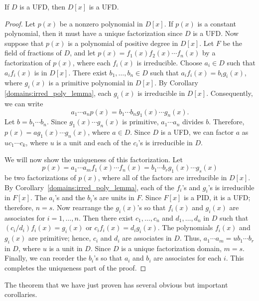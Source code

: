 \begin{theorem}
If $D$ is a UFD, then $D[x]$ is a UFD.
\end{theorem}
 
 
\begin{proof}
Let $p(x)$ be a nonzero polynomial in $D[x]$.  If $p(x)$ is a constant
polynomial, then it must have a unique factorization since $D$ is a
UFD. Now suppose that $p(x)$ is a polynomial of positive degree in
$D[x]$. Let $F$ be the field of fractions of $D$, and let $p(x) =
f_1(x) f_2(x) \cdots f_n(x)$ by a factorization of $p(x)$, where each
$f_i(x)$ is irreducible. Choose $a_i \in D$ such that $a_i f_i(x)$ is in
$D[x]$. There exist $b_1, \ldots, b_n \in D$ such that $a_i f_i(x) =
b_i g_i(x)$, where $g_i(x)$ is a primitive polynomial in $D[x]$. By 
Corollary \ref{domains:irred_poly_lemma}, each $g_i(x)$ is irreducible in $D[x]$. Consequently, 
we can write
\[
a_1 \cdots a_n p(x) = b_1 \cdots b_n g_1(x) \cdots g_n(x).
\]
Let $b = b_1 \cdots b_n$. Since $g_1(x) \cdots g_n(x)$ is primitive,
$a_1 \cdots a_n$ divides $b$. Therefore, $p(x) = a g_1(x) \cdots
g_n(x)$, where $a \in D$. Since $D$ is a UFD, we can factor $a$ as $u
c_1 \cdots c_k$, where $u$ is a unit and each of the $c_i$'s is
irreducible in $D$. 


We will now show the uniqueness of this factorization. Let
\[
p(x) = a_1 \cdots a_m f_1(x) \cdots f_n(x) = b_1 \cdots b_r g_1(x)
\cdots g_s(x)
\]
be two factorizations of $p(x)$, where all of the factors are
irreducible in $D[x]$.  By Corollary~\ref{domains:irred_poly_lemma}, each of the $f_i$'s and
$g_i$'s is irreducible in $F[x]$. The $a_i$'s and the $b_i$'s are
units in $F$. Since $F[x]$ is a PID, it is a UFD; therefore, $n=s$.
Now rearrange the $g_i(x)$'s so that $f_i(x)$ and $g_i(x)$ are
associates for $i = 1, \ldots, n$.  Then there exist $c_1, \ldots,
c_n$ and $d_1, \ldots, d_n$ in $D$ such that $(c_i / d_i) f_i(x) =
g_i(x)$ or $c_i f_i(x) = d_i g_i(x)$. The polynomials $f_i(x)$ and
$g_i(x)$ are primitive; hence, $c_i$ and $d_i$ are associates in $D$.
Thus, $a_1 \cdots a_m = u b_1 \cdots b_r$ in $D$, where $u$ is a unit
in $D$. Since $D$ is a unique factorization domain, $m =s$. Finally,
we can reorder the $b_i$'s so that $a_i$ and $b_i$ are associates for
each $i$. This completes the uniqueness part of the proof.   
\end{proof}


\medskip


The theorem that we have just proven has several obvious but important 
corollaries. 
 

